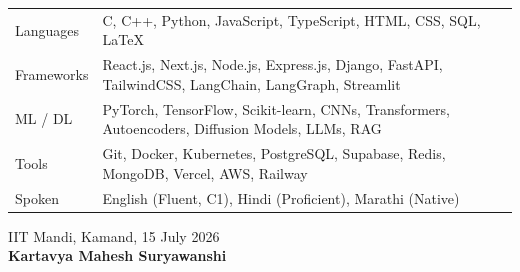 \documentclass[a4paper,10pt]{article}
\begin{document}
\begin{tabular}{L W}
Languages  & C, C++, Python, JavaScript, TypeScript, HTML, CSS, SQL, \LaTeX \\
Frameworks & React.js, Next.js, Node.js, Express.js, Django, FastAPI, TailwindCSS, LangChain, LangGraph, Streamlit \\
ML / DL    & PyTorch, TensorFlow, Scikit-learn, CNNs, Transformers, Autoencoders, Diffusion Models, LLMs, RAG \\
Tools      & Git, Docker, Kubernetes, PostgreSQL, Supabase, Redis, MongoDB, Vercel, AWS, Railway \\
Spoken     & English (Fluent, C1), Hindi (Proficient), Marathi (Native)
\end{tabular}

\vfill
\begin{flushleft}
IIT Mandi, Kamand, 15 July 2026 \\[0.6cm]
\textbf{Kartavya Mahesh Suryawanshi}
\end{flushleft}
\end{document}
